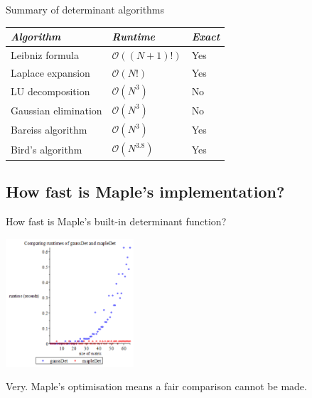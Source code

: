 \documentclass{beamer}
\begin{document}
\begin{frame}{Summary of determinant algorithms}

    \begin{center}
        \begin{tabular}{l l l}
            \toprule
            \emph{Algorithm}     & \emph{Runtime}           & \emph{Exact} \\
            \midrule
            Leibniz formula      & $\mathcal{O}((N+1)!)$    & Yes \\
            Laplace expansion    & $\mathcal{O}(N!)$        & Yes \\
            LU decomposition     & $\mathcal{O}(N^3)$       & No \\
            Gaussian elimination & $\mathcal{O}(N^3)$       & No \\
            Bareiss algorithm    & $\mathcal{O}(N^3)$       & Yes \\
            Bird's algorithm     & $\mathcal{O}(N^{3.8})$   & Yes \\
            \bottomrule
        \end{tabular}
    \end{center}

\end{frame}

\subsection{How fast is Maple's implementation?}

\begin{frame}{How fast is Maple's built-in determinant function?}

    \begin{center}{}
        \includegraphics[height=180]{gauss-maple}
    \end{center}

    Very. Maple's optimisation means a fair comparison cannot be made.

\end{frame}
\end{document}
